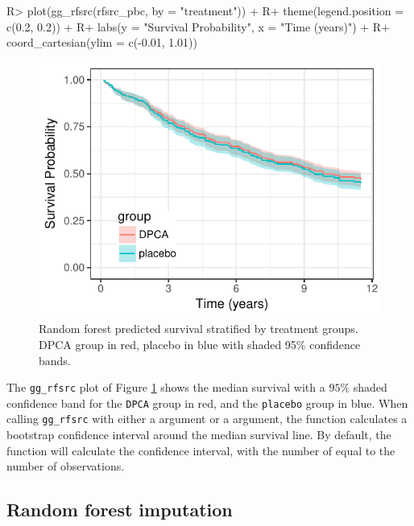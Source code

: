 \documentclass[article]{jss}
\begin{document}
\begin{Schunk}
\begin{Sinput}
R> plot(gg_rfsrc(rfsrc_pbc, by = "treatment")) +
R+   theme(legend.position = c(0.2, 0.2)) +
R+   labs(y = "Survival Probability", x = "Time (years)") +
R+   coord_cartesian(ylim = c(-0.01, 1.01))
\end{Sinput}
\begin{figure}[!htb]

{\centering \includegraphics{fig-rfs/rfs-rfsrc-mean2-1} 

}

\caption[Random forest predicted survival stratified by treatment groups]{Random forest predicted survival stratified by treatment groups. DPCA group in red, placebo in blue with shaded 95\% confidence bands.}\label{fig:rfsrc-mean2}
\end{figure}
\end{Schunk}

The \texttt{gg\_rfsrc} plot of Figure \ref{fig:rfsrc-mean2} shows the
median survival with a \(95\%\) shaded confidence band for the
\texttt{DPCA} group in red, and the \texttt{placebo} group in blue. When
calling \texttt{gg\_rfsrc} with either a  argument or a
 argument, the function calculates a bootstrap confidence
interval around the median survival line. By default, the function will
calculate the  confidence interval, with the number
of  equal to the number of observations.

\subsection{Random forest imputation}\label{random-forest-imputation}
\end{document}
